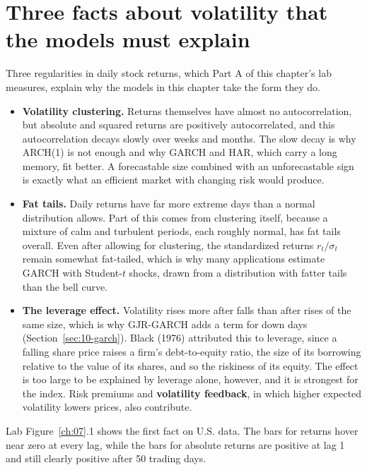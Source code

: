 \section[Three facts about volatility]{Three facts about volatility that the models must explain}
\label{sec:10-how}

Three regularities in daily stock returns, which Part A of this chapter's lab measures, explain why the models in this chapter take the form they do.

\begin{itemize}
  \item \textbf{Volatility clustering.} Returns themselves have almost no autocorrelation, but absolute and squared returns are positively autocorrelated, and this autocorrelation decays slowly over weeks and months. The slow decay is why ARCH(1) is not enough and why GARCH and HAR, which carry a long memory, fit better. A forecastable size combined with an unforecastable sign is exactly what an efficient market with changing risk would produce.
  \item \textbf{Fat tails.} Daily returns have far more extreme days than a normal distribution allows. Part of this comes from clustering itself, because a mixture of calm and turbulent periods, each roughly normal, has fat tails overall. Even after allowing for clustering, the standardized returns $r_t / \sigma_t$ remain somewhat fat-tailed, which is why many applications estimate GARCH with Student-$t$ shocks, drawn from a distribution with fatter tails than the bell curve.
  \item \textbf{The leverage effect.} Volatility rises more after falls than after rises of the same size, which is why GJR-GARCH adds a term for down days (Section~\ref{sec:10-garch}). Black (1976) attributed this to leverage, since a falling share price raises a firm's debt-to-equity ratio, the size of its borrowing relative to the value of its shares, and so the riskiness of its equity. The effect is too large to be explained by leverage alone, however, and it is strongest for the index. Risk premiums and \textbf{volatility feedback}, in which higher expected volatility lowers prices, also contribute.
\end{itemize}

Lab Figure~\ref{ch:07}.1 shows the first fact on U.S. data. The bars for returns hover near zero at every lag, while the bars for absolute returns are positive at lag 1 and still clearly positive after 50 trading days.



